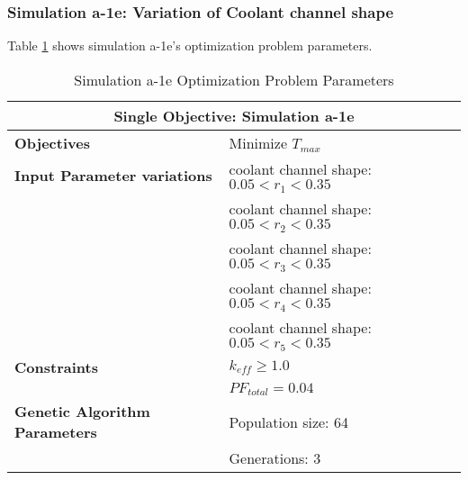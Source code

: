 \subsubsection{Simulation a-1e: Variation of Coolant channel shape}
Table \ref{tab:simulationa1e} shows simulation a-1e's optimization problem parameters. 
\begin{table}[htbp!]
    \centering
    \onehalfspacing
    \caption{Simulation a-1e Optimization Problem Parameters}
	\label{tab:simulationa1e}
    \footnotesize
    \begin{tabular}{l|p{6cm}}
    \hline 
    \multicolumn{2}{c}{\textbf{Single Objective: Simulation a-1e}} \\
    \hline 
    \textbf{Objectives} & Minimize $T_{max}$ \\
    \hline 
    \textbf{Input Parameter variations} 
    & coolant channel shape: $0.05<r_{1}<0.35$ \\
    & coolant channel shape: $0.05<r_{2}<0.35$ \\
    & coolant channel shape: $0.05<r_{3}<0.35$ \\
    & coolant channel shape: $0.05<r_{4}<0.35$ \\
    & coolant channel shape: $0.05<r_{5}<0.35$ \\
    \hline
    \textbf{Constraints} & $k_{eff} \geq 1.0$\\ 
    & $PF_{total} = 0.04 $\\ 
    \hline 
    \textbf{Genetic Algorithm Parameters} & Population size: 64 \\
    & Generations: 3 \\
    \hline
    \end{tabular}
\end{table}

